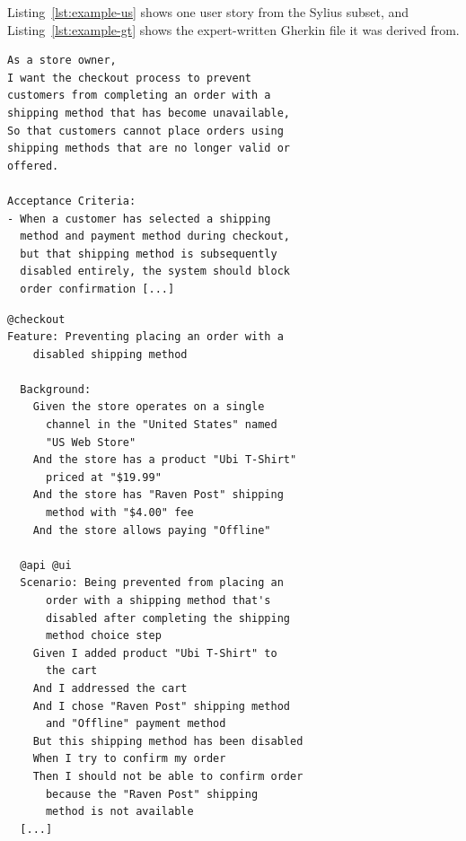Listing~\ref{lst:example-us} shows one user story from the Sylius
subset, and Listing~\ref{lst:example-gt} shows the expert-written
Gherkin file it was derived from.

\begin{lstlisting}[float=ht, basicstyle=\ttfamily\scriptsize, frame=tb, captionpos=b, aboveskip=1em, belowskip=1em, breaklines=true, columns=fullflexible, caption={Example Connextra user story (id 1, Sylius, excerpt).},label={lst:example-us}]
As a store owner,
I want the checkout process to prevent
customers from completing an order with a
shipping method that has become unavailable,
So that customers cannot place orders using
shipping methods that are no longer valid or
offered.

Acceptance Criteria:
- When a customer has selected a shipping
  method and payment method during checkout,
  but that shipping method is subsequently
  disabled entirely, the system should block
  order confirmation [...]
\end{lstlisting}

\begin{lstlisting}[float=ht, basicstyle=\ttfamily\scriptsize, frame=tb, captionpos=b, aboveskip=1em, belowskip=1em, breaklines=true, columns=fullflexible, caption={Corresponding expert-written Gherkin ground truth (excerpt).},label={lst:example-gt}]
@checkout
Feature: Preventing placing an order with a
    disabled shipping method

  Background:
    Given the store operates on a single
      channel in the "United States" named
      "US Web Store"
    And the store has a product "Ubi T-Shirt"
      priced at "$19.99"
    And the store has "Raven Post" shipping
      method with "$4.00" fee
    And the store allows paying "Offline"

  @api @ui
  Scenario: Being prevented from placing an
      order with a shipping method that's
      disabled after completing the shipping
      method choice step
    Given I added product "Ubi T-Shirt" to
      the cart
    And I addressed the cart
    And I chose "Raven Post" shipping method
      and "Offline" payment method
    But this shipping method has been disabled
    When I try to confirm my order
    Then I should not be able to confirm order
      because the "Raven Post" shipping
      method is not available
  [...]
\end{lstlisting}

